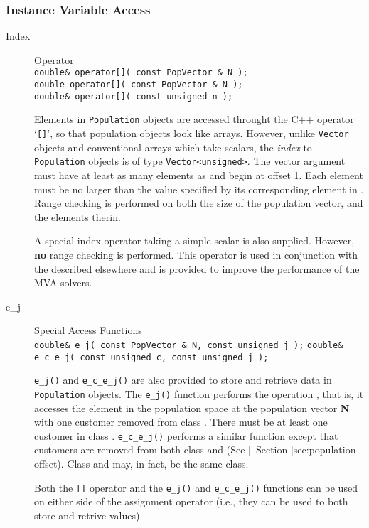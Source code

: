\subsubsection{Instance Variable Access}

\begin{description}
\item[Index] \texonly{---} Operator\\
  \texttt{double\& operator[]( const PopVector \& N );}\\
  \texttt{double operator[]( const PopVector \& N );}\\
  \texttt{double\& operator[]( const unsigned n );}

  Elements in \texttt{Population} objects are accessed throught the C++
  operator `\texttt{[]}', so that population objects look like arrays.
  However, unlike \texttt{Vector} objects and conventional arrays which
  take scalars, the \emph{index} to \texttt{Population} objects is of type
  \texttt{Vector<unsigned>}.  The vector argument must have at least as
  many elements as  and begin
  at offset 1.  Each element must be no larger than the value specified
  by its corresponding element in
  .  Range checking is
  performed on both the size of the population vector, and the elements
  therin.

  A special index operator taking a simple scalar  is also
  supplied.  However, {\bf no} range checking is performed.  This
  operator is used in conjunction with the  described elsewhere and is provided
  to improve the performance of the MVA solvers.

\item[e\_j] \texonly{---} Special Access Functions\\
  \texttt{double\& e\_j( const PopVector \& N, const unsigned j );} \linebreak
  \texttt{double\& e\_c\_e\_j( const unsigned c, const unsigned j );}

  \texttt{e\_j()} and \texttt{e\_c\_e\_j()} are also provided to store and
  retrieve data in \texttt{Population} objects.  The \texttt{e\_j()} function
  performs the operation , that is, it accesses the
  element in the population space at the population vector {\bf N} with
  one customer removed from class .  There must be at least one
  customer in class .  \texttt{e\_c\_e\_j()} performs a similar
  function except that customers are removed from both class  and
   (See [~Section
  \Ref]{sec:population-offset}).  Class  and  may, in
  fact, be the same class.

  Both the \texttt{[]} operator and the \texttt{e\_j()} and \texttt{e\_c\_e\_j()}
  functions can be used on either side of the assignment operator (i.e.,
  they can be used to both store and retrive values).
\end{description}

